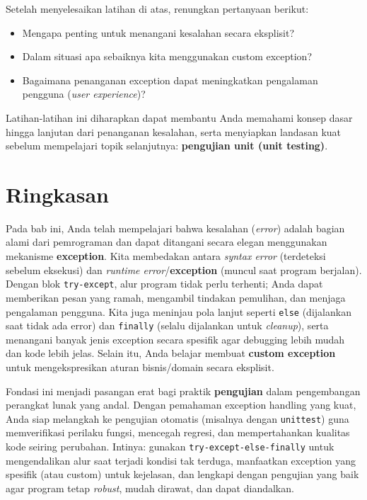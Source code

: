 Setelah menyelesaikan latihan di atas, renungkan pertanyaan berikut:
\begin{itemize}
    \item Mengapa penting untuk menangani kesalahan secara eksplisit?
    \item Dalam situasi apa sebaiknya kita menggunakan custom exception?
    \item Bagaimana penanganan exception dapat meningkatkan pengalaman pengguna (\textit{user experience})?
\end{itemize}

Latihan-latihan ini diharapkan dapat membantu Anda memahami konsep dasar hingga lanjutan dari penanganan kesalahan, serta menyiapkan landasan kuat sebelum mempelajari topik selanjutnya: \textbf{pengujian unit (unit testing)}.


\section{Ringkasan}

Pada bab ini, Anda telah mempelajari bahwa kesalahan (\textit{error}) adalah bagian alami dari pemrograman dan dapat ditangani secara elegan menggunakan mekanisme \textbf{exception}. Kita membedakan antara \textit{syntax error} (terdeteksi sebelum eksekusi) dan \textit{runtime error}/\textbf{exception} (muncul saat program berjalan). Dengan blok \texttt{try-except}, alur program tidak perlu terhenti; Anda dapat memberikan pesan yang ramah, mengambil tindakan pemulihan, dan menjaga pengalaman pengguna. Kita juga meninjau pola lanjut seperti \texttt{else} (dijalankan saat tidak ada error) dan \texttt{finally} (selalu dijalankan untuk \textit{cleanup}), serta menangani banyak jenis exception secara spesifik agar debugging lebih mudah dan kode lebih jelas. Selain itu, Anda belajar membuat \textbf{custom exception} untuk mengekspresikan aturan bisnis/domain secara eksplisit.

Fondasi ini menjadi pasangan erat bagi praktik \textbf{pengujian} dalam pengembangan perangkat lunak yang andal. Dengan pemahaman exception handling yang kuat, Anda siap melangkah ke pengujian otomatis (misalnya dengan \texttt{unittest}) guna memverifikasi perilaku fungsi, mencegah regresi, dan mempertahankan kualitas kode seiring perubahan. Intinya: gunakan \texttt{try-except-else-finally} untuk mengendalikan alur saat terjadi kondisi tak terduga, manfaatkan exception yang spesifik (atau custom) untuk kejelasan, dan lengkapi dengan pengujian yang baik agar program tetap \textit{robust}, mudah dirawat, dan dapat diandalkan.
